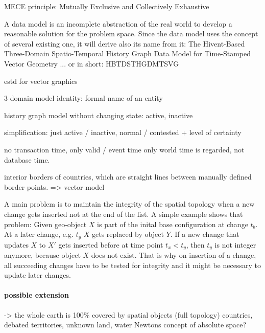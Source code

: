 MECE principle: Mutually Exclusive and Collectively Exhaustive


A data model is an incomplete abstraction of the real world to develop a reasonable solution for the problem space.
Since the data model uses the concept of several existing one, it will derive also its name from it: The Hivent-Based Three-Domain Spatio-Temporal History Graph Data Model for Time-Stamped Vector Geometry
... or in short: HBTDSTHGDMTSVG

estd for vector graphics

3 domain model
identity: formal name of an entity

history graph model without changing state: active, inactive

simplification: just active / inactive, normal / contested + level of certainty

no transaction time, only valid / event time
only world time is regarded, not database time.


interior borders of countries, which are straight lines between manually defined border points.
=> vector model

A main problem is to maintain the integrity of the spatial topology when a new change gets inserted not at the end of the list. A simple example shows that problem: Given geo-object $X$ is part of the inital base configuration at change $t_b$. At a later change, e.g. $t_y$ $X$ gets replaced by object $Y$. If a new change that updates $X$ to $X'$ gets inserted before at time point $t_x < t_y$, then $t_y$ is not integer anymore, because object $X$ does not exist. That is why on insertion of a change, all succeeding changes have to be tested for integrity and it might be necessary to update later changes.



\paragraph{possible extension} %
\label{par:possible_extension}


-> the whole earth is 100\% covered by spatial objects (full topology)
  countries, debated territories, unknown land, water
  Newtons concept of absolute space?


